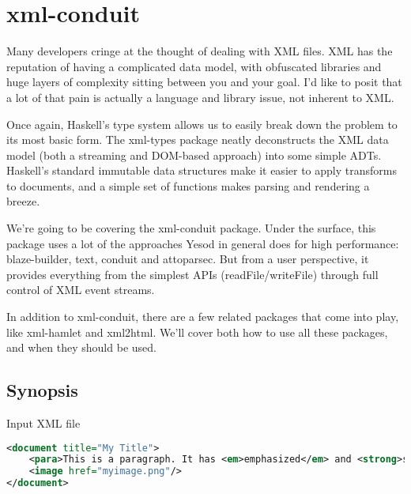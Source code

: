\chapter{xml-conduit}

Many developers cringe at the thought of dealing with XML files. XML has the reputation of
having a complicated data model, with obfuscated libraries and huge layers of complexity sitting
between you and your goal. I'd like to posit that a lot of that pain is actually a language and
library issue, not inherent to XML.

Once again, Haskell's type system allows us to easily break down the problem to its most basic
form. The xml-types package neatly deconstructs the XML data model (both a
streaming and DOM-based approach) into some simple ADTs. Haskell's standard immutable data
structures make it easier to apply transforms to documents, and a simple set of functions makes
parsing and rendering a breeze.

We're going to be covering the xml-conduit package. Under
the surface, this package uses a lot of the approaches Yesod in general does for high
performance: blaze-builder, text,
conduit and attoparsec. But from a
user perspective, it provides everything from the simplest APIs
(readFile/writeFile) through full control of XML event
streams.

In addition to xml-conduit, there are a few related packages that
come into play, like xml-hamlet and xml2html. We'll cover both how to use all these packages, and when they should be used.

\section{Synopsis}

Input XML file

\begin{lstlisting}[language=XML]
<document title="My Title">
    <para>This is a paragraph. It has <em>emphasized</em> and <strong>strong</strong> words.</para>
    <image href="myimage.png"/>
</document>
\end{lstlisting}

